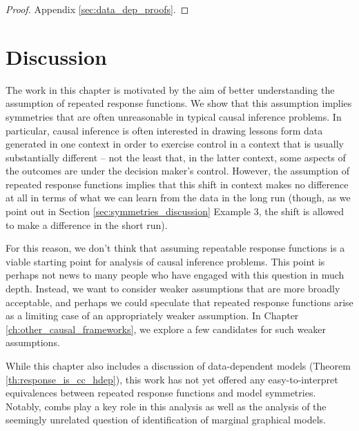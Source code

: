 \begin{proof}
Appendix \ref{sec:data_dep_proofs}.
\end{proof}

\section{Discussion}\label{sec:discussion}

The work in this chapter is motivated by the aim of better understanding the assumption of repeated response functions. We show that this assumption implies symmetries that are often unreasonable in typical causal inference problems. In particular, causal inference is often interested in drawing lessons form data generated in one context in order to exercise control in a context that is usually substantially different -- not the least that, in the latter context, some aspects of the outcomes are under the decision maker's control. However, the assumption of repeated response functions implies that this shift in context makes no difference at all in terms of what we can learn from the data in the long run (though, as we point out in Section \ref{sec:symmetries_discussion} Example 3, the shift is allowed to make a difference in the short run).

For this reason, we don't think that assuming repeatable response functions is a viable starting point for analysis of causal inference problems. This point is perhaps not news to many people who have engaged with this question in much depth. Instead, we want to consider weaker assumptions that are more broadly acceptable, and perhaps we could speculate that repeated response functions arise as a limiting case of an appropriately weaker assumption. In Chapter \ref{ch:other_causal_frameworks}, we explore a few candidates for such weaker assumptions.

While this chapter also includes a discussion of data-dependent models (Theorem \ref{th:response_is_cc_hdep}), this work has not yet offered any easy-to-interpret equivalences between repeated response functions and model symmetries. Notably, combs play a key role in this analysis as well as the analysis of the seemingly unrelated question of identification of marginal graphical models.



